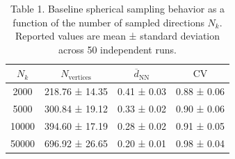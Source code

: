 
\begin{table}[htbp]
\centering
\caption{Table 1. Baseline spherical sampling behavior as a function of the number of sampled directions $N_k$. Reported values are mean ± standard deviation across 50 independent runs.}
\label{tab:baseline_nk_sweep}
\vspace{1.75em}
\begin{tabular*}{\columnwidth}{@{\extracolsep{\fill}}cccc@{}}
\toprule
$N_k$ & $N_{\text{vertices}}$ & $\overline{d}_{\text{NN}}$ & $\mathrm{CV}$ \\
\midrule
2000 & 218.76 ± 14.35 & 0.41 ± 0.03 & 0.88 ± 0.06 \\
5000 & 300.84 ± 19.12 & 0.33 ± 0.02 & 0.90 ± 0.06 \\
10000 & 394.60 ± 17.19 & 0.28 ± 0.02 & 0.91 ± 0.05 \\
50000 & 696.92 ± 26.65 & 0.20 ± 0.01 & 0.98 ± 0.04 \\
\bottomrule
\end{tabular*}
\end{table}
